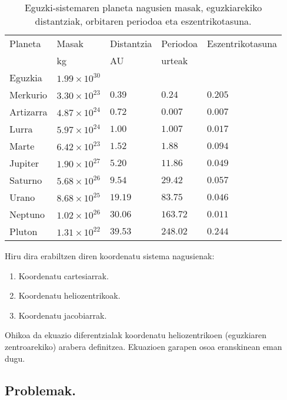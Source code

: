 \begin{table} [h!]
\caption{Eguzki-sistemaren planeta nagusien masak, eguzkiarekiko distantziak, orbitaren periodoa eta eszentrikotasuna.}
\label{tab:eguz-sist}       %
\begin{tabular}{l l l l l} 
\hline
 Planeta   &  Masak                 & Distantzia   & Periodoa    & Eszentrikotasuna\\   
           &  kg                    & AU           &   urteak    &               \\ \hline
 Eguzkia   &  $1.99 \times 10^{30}$ &              &             &               \\         
 Merkurio  &  $3.30 \times 10^{23}$ & $0.39$       &  $0.24$     &  $0.205$      \\
 Artizarra &  $4.87 \times 10^{24}$ & $0.72$       &  $0.007$    &  $0.007$      \\
 Lurra     &  $5.97 \times 10^{24}$ & $1.00$       &  $1.007$    &  $0.017$      \\
 Marte     &  $6.42 \times 10^{23}$ & $1.52$       &  $1.88$     &  $0.094$      \\ \hline
 Jupiter   &  $1.90 \times 10^{27}$ & $5.20$       &  $11.86$    &  $0.049$      \\
 Saturno   &  $5.68 \times 10^{26}$ & $9.54$       &  $29.42$    &  $0.057$      \\
 Urano     &  $8.68 \times 10^{25}$ & $19.19$      &  $83.75$    &  $0.046$      \\
 Neptuno   &  $1.02 \times 10^{26}$ & $30.06$      &  $163.72$   &  $0.011$      \\
 Pluton    &  $1.31 \times 10^{22}$ & $39.53$      &  $248.02$   &  $0.244$      \\
\hline
\end{tabular}
\end{table}

Hiru dira erabiltzen diren koordenatu sistema nagusienak:
\begin{enumerate}
\item Koordenatu cartesiarrak.
\item Koordenatu heliozentrikoak.
\item Koordenatu jacobiarrak.
\end{enumerate}

Ohikoa da ekuazio diferentzialak koordenatu heliozentrikoen (eguzkiaren zentroarekiko) arabera definitzea. 
Ekuazioen garapen osoa eranskinean eman dugu.


\subsection{Problemak.}
\label{ss:342}

